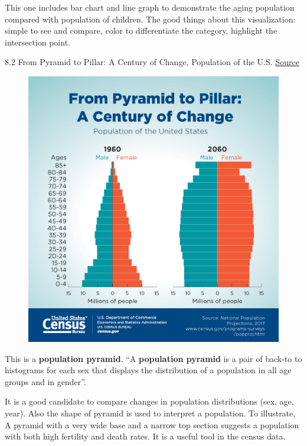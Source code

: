 \documentclass[]{book}
\theoremstyle{definition}
\theoremstyle{definition}
\theoremstyle{definition}
\theoremstyle{remark}
\begin{document}
This one includes bar chart and line graph to demonstrate the aging
population compared with population of children. The good things about
this visualization: simple to see and compare, color to differentiate
the category, highlight the intersection point.

8.2 From Pyramid to Pillar: A Century of Change, Population of the U.S.
\href{https://www.census.gov/library/visualizations/2018/comm/century-of-change.html}{Source}

\begin{figure}
\centering
\includegraphics{images/Pyramid.jpg}
\caption{}
\end{figure}

This is a \textbf{population pyramid}. ``A \textbf{population pyramid}
is a pair of back-to to histograms for each sex that displays the
distribution of a population in all age groups and in gender''.

It is a good candidate to compare changes in population distributions
(sex, age, year). Also the shape of pyramid is used to interpret a
population. To illustrate, A pyramid with a very wide base and a narrow
top section suggests a population with both high fertility and death
rates. It is a useful tool in the census data.
\end{document}
